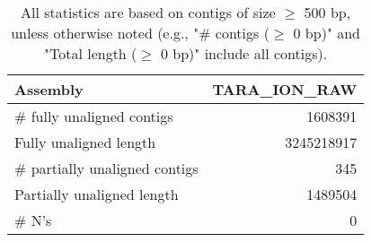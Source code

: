\documentclass[12pt,a4paper]{article}
\begin{document}
\begin{table}[ht]
\begin{center}
\caption{All statistics are based on contigs of size $\geq$ 500 bp, unless otherwise noted (e.g., "\# contigs ($\geq$ 0 bp)" and "Total length ($\geq$ 0 bp)" include all contigs).}
\begin{tabular}{|l*{1}{|r}|}
\hline
Assembly & TARA\_ION\_RAW \\ \hline
\# fully unaligned contigs & 1608391 \\ \hline
Fully unaligned length & 3245218917 \\ \hline
\# partially unaligned contigs & 345 \\ \hline
Partially unaligned length & 1489504 \\ \hline
\# N's & 0 \\ \hline
\end{tabular}
\end{center}
\end{table}
\end{document}
